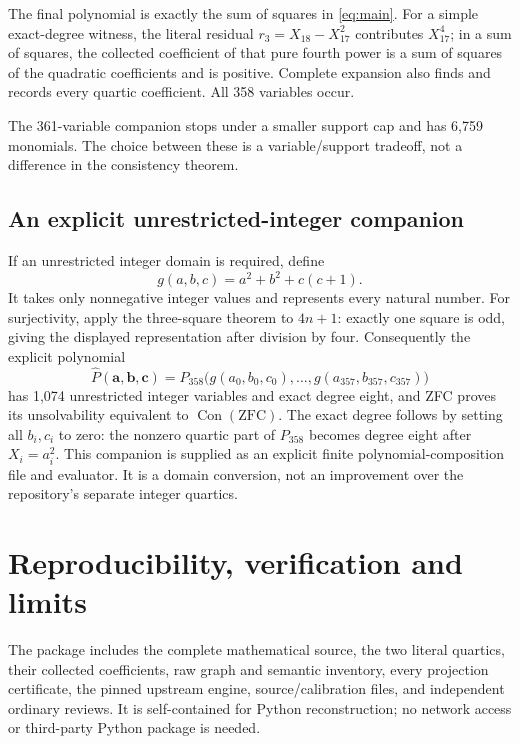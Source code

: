 \documentclass[11pt]{article}
\theoremstyle{definition}\newtheorem{definition}[theorem]{Definition}
\newcommand{\Con}{\operatorname{Con}}\newcommand{\Refut}{\operatorname{Ref}}
\newcommand{\Pmain}{P_{358}}
\begin{document}
The final polynomial is exactly the sum of squares in \eqref{eq:main}.
For a simple exact-degree witness, the literal residual
$r_3=X_{18}-X_{17}^2$ contributes $X_{17}^4$; in a sum of squares,
the collected coefficient of that pure fourth power is a sum of squares
of the quadratic coefficients and is positive. Complete expansion also
finds and records every quartic coefficient. All 358 variables occur.

The 361-variable companion stops under a smaller support cap and has
6,759 monomials. The choice between these is a variable/support tradeoff,
not a difference in the consistency theorem.

\subsection{An explicit unrestricted-integer companion}
If an unrestricted integer domain is required, define
\[
 g(a,b,c)=a^2+b^2+c(c+1).
\]
It takes only nonnegative integer values and represents every natural
number. For surjectivity, apply the three-square theorem to $4n+1$:
exactly one square is odd, giving the displayed representation after
division by four. Consequently the explicit polynomial
\begin{equation}\label{eq:integer}
 \widehat P(\boldsymbol a,\boldsymbol b,\boldsymbol c)
 =\Pmain\bigl(g(a_0,b_0,c_0),\ldots,g(a_{357},b_{357},c_{357})\bigr)
\end{equation}
has 1,074 unrestricted integer variables and exact degree eight, and
ZFC proves its unsolvability equivalent to $\Con(\mathrm{ZFC})$.
The exact degree follows by setting all $b_i,c_i$ to zero: the nonzero
quartic part of $\Pmain$ becomes degree eight after $X_i=a_i^2$.
This companion is supplied as an explicit finite polynomial-composition
file and evaluator. It is a domain conversion, not an improvement over
the repository's separate integer quartics.

\section{Reproducibility, verification and limits}
The package includes the complete mathematical source, the two literal
quartics, their collected coefficients, raw graph and semantic inventory,
every projection certificate, the pinned upstream engine, source/calibration
files, and independent ordinary reviews. It is self-contained for Python
reconstruction; no network access or third-party Python package is needed.
\end{document}
